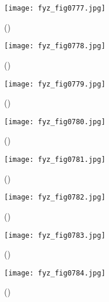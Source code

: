     \begin{figure}[ht!] %
      \centering
      \texttt{[image: fyz\_fig0777.jpg]}
      \caption{
               (\cite[s.~707]{Feynman02})}
      \label{fyz:fig0777}
    \end{figure}

    \begin{figure}[ht!] %
      \centering
      \texttt{[image: fyz\_fig0778.jpg]}
      \caption{
               (\cite[s.~707]{Feynman02})}
      \label{fyz:fig0778}
    \end{figure}

    \begin{figure}[ht!] %
      \centering
      \texttt{[image: fyz\_fig0779.jpg]}
      \caption{
               (\cite[s.~707]{Feynman02})}
      \label{fyz:fig0779}
    \end{figure}

    \begin{figure}[ht!] %
      \centering
      \texttt{[image: fyz\_fig0780.jpg]}
      \caption{
               (\cite[s.~707]{Feynman02})}
      \label{fyz:fig0780}
    \end{figure}

    \begin{figure}[ht!] %
      \centering
      \texttt{[image: fyz\_fig0781.jpg]}
      \caption{
               (\cite[s.~707]{Feynman02})}
      \label{fyz:fig0781}
    \end{figure}

    \begin{figure}[ht!] %
      \centering
      \texttt{[image: fyz\_fig0782.jpg]}
      \caption{
               (\cite[s.~707]{Feynman02})}
      \label{fyz:fig0782}
    \end{figure}

    \begin{figure}[ht!] %
      \centering
      \texttt{[image: fyz\_fig0783.jpg]}
      \caption{
               (\cite[s.~707]{Feynman02})}
      \label{fyz:fig0783}
    \end{figure}

    \begin{figure}[ht!] %
      \centering
      \texttt{[image: fyz\_fig0784.jpg]}
      \caption{
               (\cite[s.~707]{Feynman02})}
      \label{fyz:fig0784}
    \end{figure}

